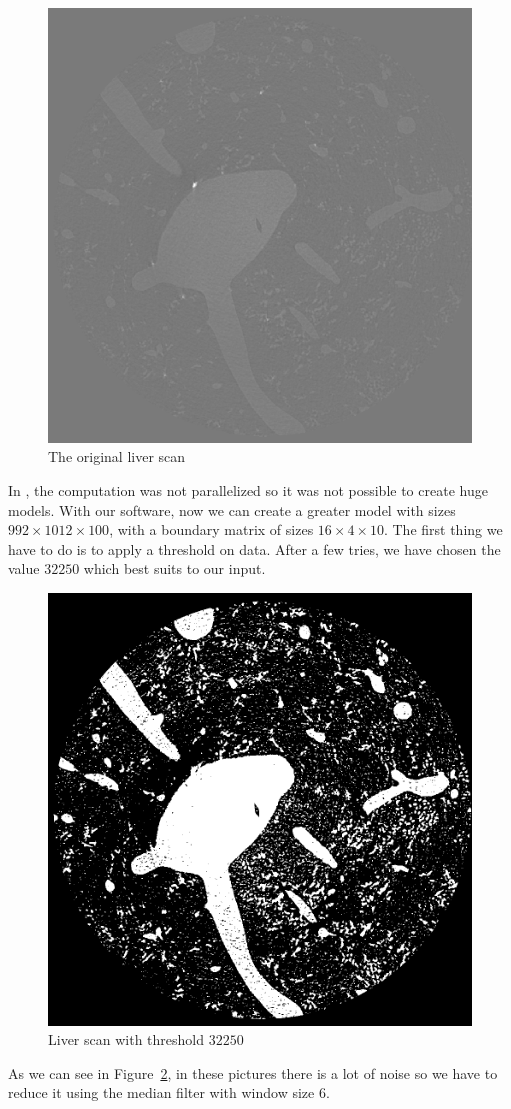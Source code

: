 \begin{figure}[htb] %
   \centering
   \includegraphics[width=0.50\linewidth]{images/Liver0.png}\hfill
   \caption[The original liver scan]{The original liver scan}
   \label{fig:LarliverModel0}
\end{figure}

In \cite{Paoluzzi}, the computation was not parallelized so it was not possible to create huge models. With our software, now we can create a greater model with sizes $992\times1012\times100$, with a boundary matrix of sizes $16\times4\times10$. The first thing we have to do is to apply a threshold on data. After a few tries, we have chosen the value $32250$ which best suits to our input.

\begin{figure}[htb] %
   \centering
   \includegraphics[width=0.40\linewidth]{images/Liver1.png}\hfill
   \caption[Liver scan with threshold $32250$]{Liver scan with threshold $32250$}
   \label{fig:LarliverModel1}
\end{figure}

As we can see in Figure~\ref{fig:LarliverModel1}, in these pictures there is a lot of noise so we have to reduce it using the median filter with window size $6$.

